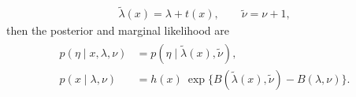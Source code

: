 \documentclass{article}
\begin{document}
\begin{align}
  \label{eq:cef-posterior-params}
  \tilde{\lambda}(x) = \lambda + t(x), 
  \qquad
  \tilde{\nu}= \nu + 1,
\end{align}
then the posterior and marginal likelihood are
\begin{align}
    \label{eq:cef-posterior-and-marginal}
    \begin{split}
    p(\eta \mid x, \lambda, \nu) &= p(\eta \mid \tilde{\lambda}(x), \tilde{\nu}),
    \\
    p(x \mid \lambda, \nu) &= h(x) \: \exp\big\{ B(\tilde{\lambda}(x), \tilde{\nu}) - B(\lambda, \nu) \big\}.
    \end{split}
\end{align}
\end{document}
